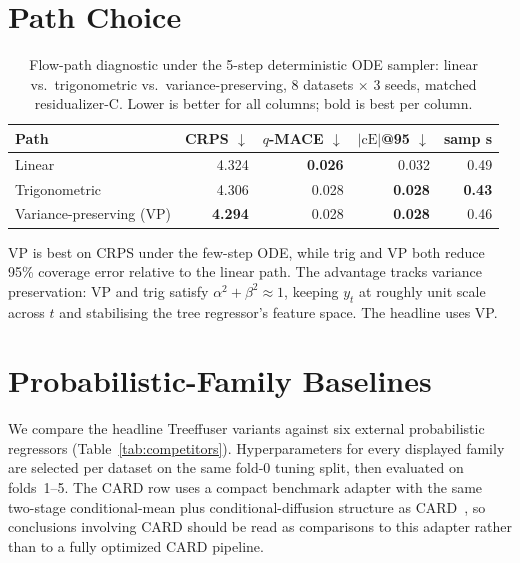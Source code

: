 \documentclass{tpm2026}
\begin{document}
\section{Path Choice}\label{app:path}

\begin{table}[!h]
  \centering
  \caption{Flow-path diagnostic under the 5-step deterministic ODE sampler: linear vs.\ trigonometric vs.\ variance-preserving, 8 datasets $\times$ 3 seeds, matched residualizer-C. Lower is better for all columns; bold is best per column.}\label{tab:path}
  \footnotesize
  \begin{tabular}{lrrrr}
    \toprule
    Path & CRPS $\downarrow$ & $q$-MACE $\downarrow$ & $|\text{cE}|$@95 $\downarrow$ & samp s \\
    \midrule
    Linear         & 4.324 & \textbf{0.026} & 0.032 & 0.49 \\
    Trigonometric  & 4.306 & 0.028 & \textbf{0.028} & \textbf{0.43} \\
    Variance-preserving (VP) & \textbf{4.294} & 0.028 & \textbf{0.028} & 0.46 \\
    \bottomrule
  \end{tabular}
\end{table}

VP is best on CRPS under the few-step ODE, while trig and VP both reduce 95\% coverage error relative to the linear path. The advantage tracks variance preservation: VP and trig satisfy $\alpha^2+\beta^2 \approx 1$, keeping $y_t$ at roughly unit scale across $t$ and stabilising the tree regressor's feature space. The headline uses VP.

\section{Probabilistic-Family Baselines}\label{app:competitors}

We compare the headline Treeffuser variants against six external probabilistic regressors (Table~\ref{tab:competitors}). Hyperparameters for every displayed family are selected per dataset on the same fold-0 tuning split, then evaluated on folds~1--5. The CARD row uses a compact benchmark adapter with the same two-stage conditional-mean plus conditional-diffusion structure as CARD~\citep{han2022card}, so conclusions involving CARD should be read as comparisons to this adapter rather than to a fully optimized CARD pipeline.
\end{document}
